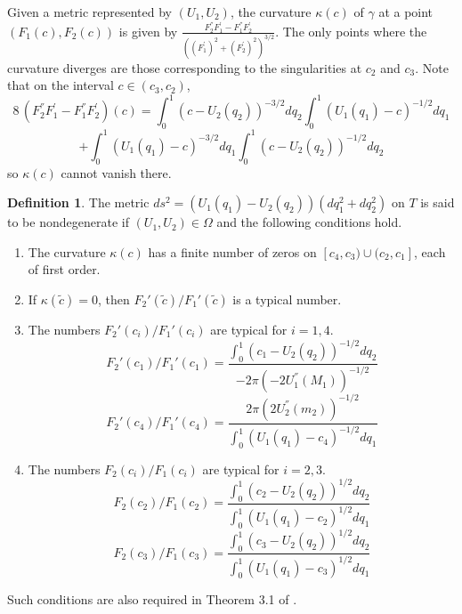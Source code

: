 \documentclass[12pt]{amsart}
\numberwithin{equation}{subsection}
\theoremstyle{definition}
\newtheorem{definition}[equation]{Definition}
\theoremstyle{plain}
\begin{document}
Given a metric represented by $(U_1,U_2)$,
the curvature $\kappa(c)$ of $\gamma$ at a point $(F_1(c),F_2(c))$ is given by $\frac{F_2^{''}F_1^{'} - F_1^{''}F_2^{'}}{((F_1^{'})^2+(F_2^{'})^2)^{3/2}}$.
The only points where the curvature diverges are those corresponding to the singularities at $c_2$ and $c_3$.
Note that on the interval $c \in (c_3,c_2)$,
\[
8\,(F_2^{''}F_1^{'} - F_1^{''}F_2^{'})(c) = \int_{0}^1 (c -
U_2(q_2))^{-3/2} dq_2 \int_{0}^1 (U_1(q_1) - c)^{-1/2} dq_1
\]
\[
+ \int_{0}^1 (U_1(q_1) - c)^{-3/2} dq_1 \int_{0}^1 (c - U_2(q_2))^{-1/2} dq_2
\]
so $\kappa(c)$ cannot vanish there.
\begin{definition}
\label{genericity}
The metric $ds^2=(U_1(q_1) - U_2(q_2))(dq_1^2 + dq_2^2)$ on $T$ is said to be nondegenerate if $(U_1,U_2) \in \Omega$
and the following conditions hold.
\begin{enumerate}
\item The curvature $\kappa(c)$ has a finite number of zeros on $[c_4,c_3) \cup (c_2,c_1]$, each of first order.
\item If $\kappa(\tilde{c})=0$, then ${F_2}'(\tilde{c})/{F_1}'(\tilde{c})$ is a typical number.
\item The numbers ${F_2}' (c_i) / {F_1}' (c_i)$ are typical for $i = 1,4$.
\[
{F_2}' (c_1) / {F_1}' (c_1) = \frac{ \int_{0}^1 (c_1 - U_2(q_2))^{-1/2} dq_2 }
{-2\pi (-2U_{1}^{''}(M_1))^{-1/2}}
\]
\[
{F_2}' (c_4) / {F_1}' (c_4) = \frac{ 2\pi (2U_{2}^{''}(m_2))^{-1/2} }
{ \int_{0}^1 (U_1(q_1) - c_4)^{-1/2} dq_1}
\]
\item The numbers $F_2 (c_i) / F_1 (c_i)$ are typical for $i = 2,3$.
\[
F_2 (c_2) / F_1 (c_2) = \frac{ \int_{0}^1 (c_2 - U_2(q_2))^{1/2} dq_2 }
{ \int_{0}^1 (U_1(q_1) - c_2)^{1/2} dq_1}
\]
\[
F_2 (c_3) / F_1 (c_3) = \frac{ \int_{0}^1 (c_3 - U_2(q_2))^{1/2} dq_2 }
{ \int_{0}^1 (U_1(q_1) - c_3)^{1/2} dq_1}
\]
\end{enumerate}
\end{definition}
Such conditions are also required in Theorem 3.1 of \cite{2}.
\end{document}
